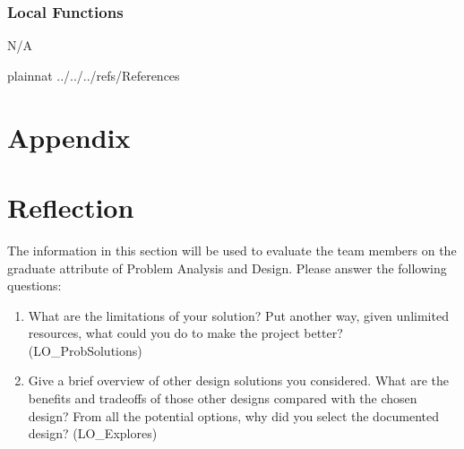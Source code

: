 \documentclass[12pt, titlepage]{article}
\begin{document}
\subsubsection{Local Functions}

N/A

\newpage

 {plainnat}
 {../../../refs/References}

\newpage

\section{Appendix} \label{Appendix}


\section{Reflection}

The information in this section will be used to evaluate the team members on the
graduate attribute of Problem Analysis and Design.  Please answer the following questions:

\begin{enumerate}
  \item What are the limitations of your solution?  Put another way, given
  unlimited resources, what could you do to make the project better? (LO\_ProbSolutions)
  \item Give a brief overview of other design solutions you considered.  What
  are the benefits and tradeoffs of those other designs compared with the chosen
  design?  From all the potential options, why did you select the documented design?
  (LO\_Explores)
\end{enumerate}
\end{document}
